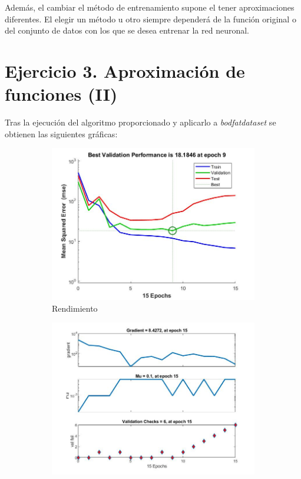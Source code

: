 \documentclass{article}
\begin{document}
Además, el cambiar el método de entrenamiento supone el tener aproximaciones
diferentes. El elegir un método u otro siempre dependerá de la función original
o del conjunto de datos con los que se desea entrenar la red neuronal.

\section{Ejercicio 3. Aproximación de funciones (II)}

Tras la ejecución del algoritmo proporcionado y aplicarlo a
\textit{bodfat\textunderscore dataset} se obtienen las siguientes gráficas: 


\begin{figure}[H]
 \centering
 \begin{subfigure}{0.4\textwidth}
  \includegraphics[width=0.8\linewidth]{../images/I_ex3_performance_bodyfat_dataset.jpg}
  \caption{Rendimiento}
 \end{subfigure}
 \begin{subfigure}{0.4\textwidth}
  \includegraphics[width=0.8\linewidth]{../images/I_ex3_trainingstate_bodyfat_dataset.jpg}

\end{subfigure}
\end{figure}
\end{document}
